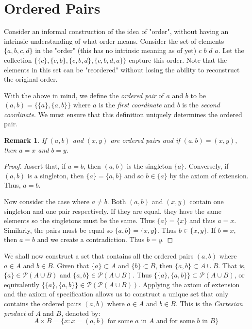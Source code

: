 \documentclass[12pt]{article}
\newtheorem{remark}{Remark}
\begin{document}
\section{Ordered Pairs}
Consider an informal construction of the idea of "order", without having an intrinsic understanding of
what order means. Consider the set of elements $\{a, b, c, d\}$ in the "order" (this has no intrinsic meaning as of yet)
$c$ $b$ $d$ $a$. Let the collection $\{\{c\}, \{c, b\}, \{c, b, d\}, \{c, b, d, a\}\}$ capture this order. Note that
the elements in this set can be "reordered" without losing the ability to reconstruct the original order.

With the above in mind, we define the \textit{ordered pair} of $a$ and $b$ to be $(a, b) = \{\{a\}, \{a, b\}\}$ where
$a$ is the \textit{first coordinate} and $b$ is the \textit{second coordinate}. We must ensure that this definition
uniquely determines the ordered pair.

\begin{remark}
    If $(a, b)$ and $(x, y)$ are ordered pairs and if $(a, b) = (x, y)$, then $a = x$ and $b = y$.
\end{remark}
\begin{proof}
    Assert that, if $a = b$, then $(a, b)$ is the singleton $\{a\}$. Conversely, if $(a, b)$ is a singleton, then
    $\{a\} = \{a, b\}$ and so $b \in \{a\}$ by the axiom of extension. Thus, $a = b$.

    Now consider the case where $a \neq b$. Both $(a, b)$ and $(x, y)$ contain one singleton and one pair
    respectively. If they are equal, they have the same elements so the singletons must be the same. Thus
    $\{a\} = \{x\}$ and thus $a = x$. Similarly, the pairs must be equal so $\{a, b\} = \{x, y\}$. Thus $b \in \{x, y\}$.
    If $b = x$, then $a = b$ and we create a contradiction. Thus $b = y$.
\end{proof}

We shall now construct a set that contains all the ordered pairs $(a, b)$ where $a \in A$ and $b \in B$.
Given that $\{a\} \subset A$ and $\{b\} \subset B$, then $\{a, b\}\subset A \cup B$. That is, $\{a\} \in \mathcal{P}(A \cup B)$
and $\{a, b\} \in \mathcal{P}(A \cup B)$. Thus $\{\{a\}, \{a, b\}\} \subset \mathcal{P}(A \cup B)$, or
equivalently $\{\{a\}, \{a, b\}\} \in \mathcal{P}(\mathcal{P}(A \cup B))$. Applying the axiom of extension and
the axiom of specification allows us to construct a unique set that only contains the ordered pairs $(a, b)$ where
$a \in A$ and $b \in B$. This is the \textit{Cartesian product} of $A$ and $B$, denoted by:
\begin{equation*}
    A \times B = \{x: x = (a, b) \text{ for some } a \text{ in } A \text{ and for some } b \text{ in } B\}
\end{equation*}
\end{document}
